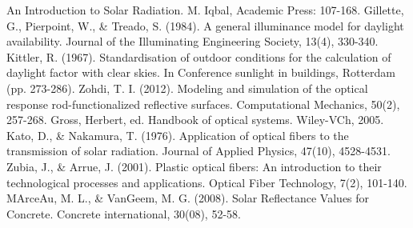 \documentclass[times, 10pt,a4paper]{article}
\begin{document}
\begin{thebibliography}{4}
An Introduction to Solar Radiation. M. Iqbal, Academic Press: 107-168.
 Gillette, G., Pierpoint, W., \& Treado, S. (1984). A general illuminance model for daylight availability.
 Journal of the Illuminating Engineering Society, 13(4), 330-340.
 Kittler, R. (1967). Standardisation of outdoor conditions for the calculation of daylight factor with 
clear skies. In Conference sunlight in buildings, Rotterdam (pp. 273-286).
 Zohdi, T. I. (2012). Modeling and simulation of the optical response rod-functionalized reflective
 surfaces. Computational Mechanics, 50(2), 257-268.
 Gross, Herbert, ed. Handbook of optical systems. Wiley-VCh, 2005.
 Kato, D., \& Nakamura, T. (1976). Application of optical fibers to the transmission of solar radiation. 
Journal of Applied Physics, 47(10), 4528-4531.
 Zubia, J., \& Arrue, J. (2001). Plastic optical fibers: An introduction to their technological processes
 and applications. Optical Fiber Technology, 7(2), 101-140.
 MArceAu, M. L., \& VanGeem, M. G. (2008). Solar Reflectance Values for Concrete. Concrete 
international, 30(08), 52-58.
\end{thebibliography}
\end{document}
